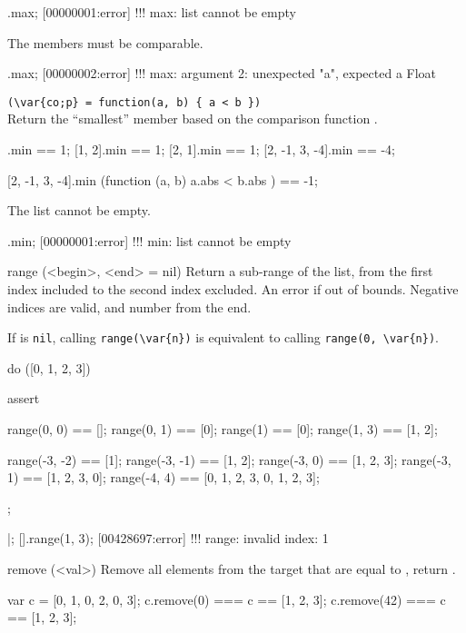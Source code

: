 \begin{urbiscriptapi}
\begin{urbiscript}
[].max;
[00000001:error] !!! max: list cannot be empty
\end{urbiscript}

The members must be comparable.
\begin{urbiscript}
[0, 2, "a", 1].max;
[00000002:error] !!! max: argument 2: unexpected "a", expected a Float
\end{urbiscript}


\item {}\lstinline|(\var{co;p} = function(a, b) { a < b })|\\%
  Return the ``smallest'' member based on the comparison function .
\begin{urbiassert}
           [1].min == 1;
        [1, 2].min == 1;
        [2, 1].min == 1;
[2, -1, 3, -4].min == -4;

[2, -1, 3, -4].min (function (a, b) { a.abs < b.abs }) == -1;
\end{urbiassert}

The list cannot be empty.

\begin{urbiscript}
[].min;
[00000001:error] !!! min: list cannot be empty
\end{urbiscript}


\item[range](<begin>, <end> = nil)%
  Return a sub-range of the list, from the first index included to the
  second index excluded.  An error if out of bounds.  Negative indices
  are valid, and number from the end.

  If  is \lstinline|nil|, calling \lstinline|range(\var{n})|
  is equivalent to calling \lstinline|range(0, \var{n})|.

\begin{urbiscript}
do ([0, 1, 2, 3])
{
  assert
  {
    range(0, 0)   == [];
    range(0, 1)   == [0];
    range(1)      == [0];
    range(1, 3)   == [1, 2];

    range(-3, -2) == [1];
    range(-3, -1) == [1, 2];
    range(-3, 0)  == [1, 2, 3];
    range(-3, 1)  == [1, 2, 3, 0];
    range(-4, 4)  == [0, 1, 2, 3, 0, 1, 2, 3];
  };
}|;
[].range(1, 3);
[00428697:error] !!! range: invalid index: 1
\end{urbiscript}


\item[remove](<val>)%
  Remove all elements from the target that are equal to , return
  \this.

\begin{urbiassert}
var c = [0, 1, 0, 2, 0, 3];
c.remove(0)  === c ==  [1, 2, 3];
c.remove(42) === c ==  [1, 2, 3];
\end{urbiassert}



\end{urbiscriptapi}
